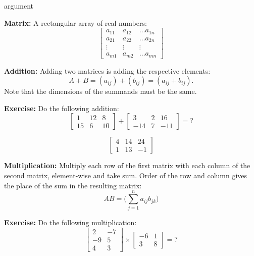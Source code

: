 \begin{labeling}{argument}
    \item[\textbf{Matrix:}] A rectangular array of real numbers:
    \[
        \begin{bmatrix}
            a_{11} & a_{12} & \ldots a_{1n} \\
            a_{21} & a_{22} & \ldots a_{2n} \\
            \vdots & \vdots & \vdots        \\
            a_{m1} & a_{m2} & \ldots a_{mn}
        \end{bmatrix}
    \]

    \item[\textbf{Addition:}] Adding two matrices is adding the respective elements:
    \[ A + B = (a_{ij}) + (b_{ij}) = (a_{ij} + b_{ij}). \]
    Note that the dimensions of the summands must be the same.

    \textbf{Exercise:} Do the following addition:
    \[
        \begin{bmatrix}
            1  & 12 & 8  \\
            15 & 6  & 10
        \end{bmatrix}
        +
        \begin{bmatrix}
            3   & 2 & 16  \\
            -14 & 7 & -11
        \end{bmatrix}
        =
        ?
    \]

    \begin{sol}
        \[
            \begin{bmatrix}
                4 & 14 & 24 \\
                1 & 13 & -1
            \end{bmatrix}
        \]
    \end{sol}


    \item[\textbf{Multiplication:}] Multiply each row of the first matrix with each column of the second matrix, element-wise and take sum. Order of the row and column gives the place of the sum in the resulting matrix:
    \[
        AB = \bigg( \sum_{j=1}^n a_{ij} b_{jk} \bigg)
    \]

    \textbf{Exercise:} Do the following multiplication:
    \[
        \begin{bmatrix}
            2  & -7 \\
            -9 & 5  \\
            4  & 3
        \end{bmatrix}
        \times
        \begin{bmatrix}
            -6 & 1 \\
            3  & 8
        \end{bmatrix}
        =
        ?
    \]


\end{labeling}
